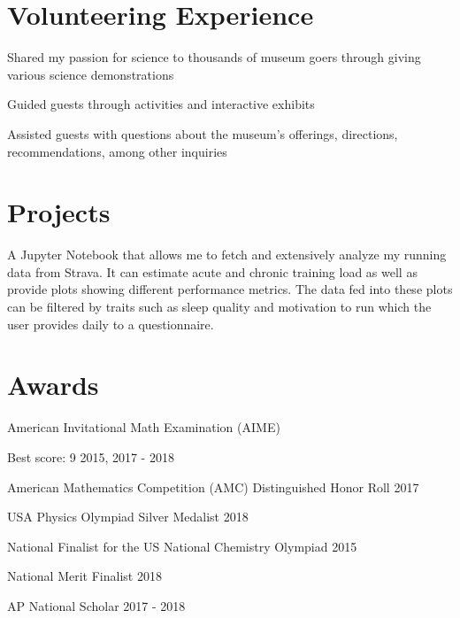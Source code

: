 \documentclass[]{deedy-resume-openfont}
\begin{document}
\begin{minipage}[t]{0.6\textwidth}
\section{Volunteering Experience}
\begin{tightemize}
\item Shared my passion for science to thousands of museum goers through giving various science demonstrations
\item Guided guests through activities and interactive exhibits
\item Assisted guests with questions about the museum's offerings, directions, recommendations, among other inquiries
\end{tightemize}


\section{Projects}

\color{primary}
A Jupyter Notebook that allows me to fetch and extensively analyze my running data from Strava. It can estimate acute and chronic training load as well as provide plots showing different performance metrics. The data fed into these plots can be filtered by traits such as sleep quality and motivation to run which the user provides daily to a questionnaire.


\section{Awards} 
\color{primary}
\begin{tightemize}
\vspace{\topsep}
\item{American Invitational Math Examination (AIME)} 

Best score: 9 \hfill 2015, 2017 - 2018
\item American Mathematics Competition (AMC) Distinguished Honor Roll  \hfill 2017
\item USA Physics Olympiad Silver Medalist \hfill 2018
\item National Finalist for the US National Chemistry Olympiad \hfill 2015
\item National Merit Finalist \hfill 2018
\item AP National Scholar \hfill 2017 - 2018
\end{tightemize}

\sectionsep

\end{minipage} 
\end{document}
